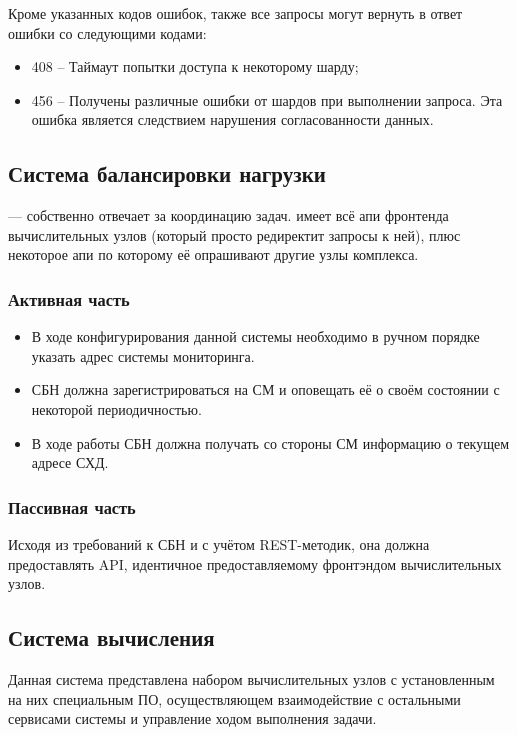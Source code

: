 \documentclass[a4paper,12pt]{report}
\numberwithin{equation}{section}
\begin{document}

Кроме указанных кодов ошибок, также все запросы могут вернуть в ответ ошибки со следующими кодами:
\begin{itemize}
  \item 408 -- Таймаут попытки доступа к некоторому шарду;
  \item 456 -- Получены различные ошибки от шардов при выполнении запроса. Эта ошибка является следствием нарушения согласованности данных.
\end{itemize}

\subsection{Система балансировки нагрузки}
--- собственно отвечает за координацию задач. имеет всё апи фронтенда вычислительных узлов (который просто редиректит запросы к ней), плюс некоторое апи по которому её опрашивают другие узлы комплекса.

\subsubsection{Активная часть}
\begin{itemize}
  \item В ходе конфигурирования данной системы необходимо в ручном порядке указать адрес системы мониторинга.
  \item СБН должна зарегистрироваться на СМ и оповещать её о своём состоянии с некоторой периодичностью.
  \item В ходе работы СБН должна получать со стороны СМ информацию о текущем адресе СХД.
\end{itemize}

\subsubsection{Пассивная часть}
Исходя из требований к СБН и с учётом REST-методик, она должна предоставлять API, идентичное предоставляемому фронтэндом вычислительных узлов.

\subsection{Система вычисления}
Данная система представлена набором вычислительных узлов с установленным на них специальным ПО, 
осуществляющем взаимодействие с остальными сервисами системы и управление ходом выполнения задачи.
\end{document}
